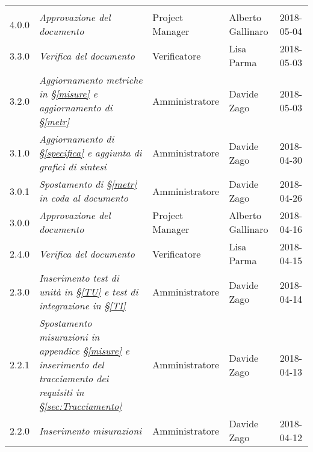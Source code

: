 
\section*{}

	\begin{longtable}[H]{C{2cm}|C{4cm}|C{3cm}|C{3cm}|R{2cm}}
		
		 & & & & \\
		
		
		4.0.0 & \emph{Approvazione del documento} & Project Manager & Alberto Gallinaro & 2018-05-04 \\
		\hline
		
		3.3.0 & \emph{Verifica del documento} & Verificatore &  Lisa Parma & 2018-05-03\\
		\hline
		
		3.2.0 & \emph{Aggiornamento metriche in §\ref{misure} e aggiornamento di §\ref{metr}} & Amministratore & Davide Zago & 2018-05-03 \\
		\hline
		
		3.1.0 & \emph{Aggiornamento di §\ref{specifica} e aggiunta di grafici di sintesi} & Amministratore & Davide Zago & 2018-04-30 \\
		\hline
		
		3.0.1 & \emph{Spostamento di §\ref{metr} in coda al documento} & Amministratore & Davide Zago & 2018-04-26 \\
		\hline
		
			3.0.0 & \emph{Approvazione del documento} & Project Manager & Alberto Gallinaro & 2018-04-16 \\
		\hline
		
		2.4.0 & \emph{Verifica del documento} & Verificatore &  Lisa Parma & 2018-04-15\\
		\hline
		
		2.3.0 & \emph{Inserimento test di unità in §\ref{TU}  e test di integrazione in §\ref{TI}} & Amministratore & Davide Zago & 2018-04-14 \\
		\hline
		
		2.2.1 & \emph{Spostamento misurazioni in appendice §\ref{misure} e inserimento del tracciamento dei requisiti in §\ref{sec:Tracciamento}} & Amministratore & Davide Zago & 2018-04-13 \\
		\hline
		
		2.2.0 & \emph{Inserimento misurazioni} & Amministratore & Davide Zago & 2018-04-12 \\
		\hline
		

\end{longtable}
